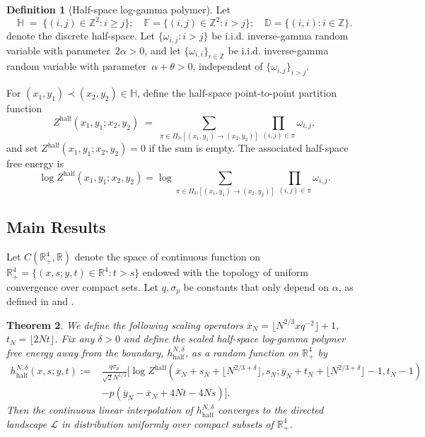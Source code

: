 \documentclass[11pt]{article}
\newtheorem{theorem}{Theorem}[section]
\theoremstyle{definition}
\newtheorem{definition}[theorem]{Definition}
\newcommand{\R}{\mathbb{R}}
\newcommand{\Z}{\mathbb{Z}}
\newcommand{\HH}{\mathbb{H}}
\newcommand{\F}{\mathbb{F}}
\newcommand{\D}{\mathbb{D}}
\begin{document}
\begin{definition}[Half-space log-gamma polymer]
Let
\[
\HH \;=\; \{(i,j)\in\Z^2 : i\ge j\} ; \quad  \F=\{(i,j)\in\Z^2 : i > j\}; \quad \D = \{(i,i): i \in \Z \}.
\]
denote the discrete half-space.  
Let $\{\omega_{i,j}: i>j\}$ be i.i.d. inverse-gamma random variable with parameter~$2\alpha >0$, and let $\{\omega_{i,i}\}_{i\in\Z}$ be  i.i.d. inverse-gamma random variable with parameter~$\alpha + \theta > 0$, independent of $\{\omega_{i,j}\}_{i>j}$.

For $(x_1,y_1)\prec(x_2,y_2) \in \HH$, define the half-space point-to-point partition function
\[
Z^{\mathrm{half}}(x_1,y_1;x_2,y_2)
\;=\;\sum_{\pi \in \Pi_{\HH}[(x_1,y_1)\to(x_2,y_2)]}
\prod_{(i,j)\in\pi} \omega_{i,j},
\]
and set $Z^{\mathrm{half}}(x_1,y_1;x_2,y_2)=0$ if the sum is empty. The associated half-space free energy is
\[
\log Z^{\mathrm{half}}(x_1,y_1;x_2,y_2) = \log \sum_{\pi \in \Pi_{\HH}[(x_1,y_1)\to(x_2,y_2)]}
\prod_{(i,j)\in\pi} \omega_{i,j}.
\]
\end{definition}

\subsection{Main Results}
Let $C(\R^4_+, \R)$ denote the space of continuous function on $\R^4_+ = \{(x,s;y,t) \in \R^4: t>s\}$ endowed with the topology of uniform convergence over compact sets. Let $q, \sigma_p$ be constants that only depend on $\alpha$, as defined in \cite[Definition 3.1]{zhang2025convergence} and \cite[Theorem 3.3]{zhang2025convergence}.

\begin{theorem}
\label{thm_half_loggamma_to_DL}
We define the following scaling operators $\overline{x}_N = \lfloor N^{2/3}xq^{-2} \rfloor + 1$, $t_N = \lfloor 2Nt \rfloor$. Fix any $\delta>0$ and define the scaled half-space log-gamma polymer free energy away from the boundary,
$h_{\mathrm{half}}^{N, \delta}$, as a random function on $\R_+^4$ by
 \begin{equation}
 \begin{aligned}
     h_{\mathrm{half}}^{N,\delta}(x,s;y,t) := &\frac{q\sigma_p}{\sqrt{2}N^{1/3}}\bigg[ \log Z^{\mathrm{half}}(\overline{x}_N + s_N+\lfloor N^{2/3+\delta}\rfloor, s_N;\overline{y}_N + t_N + \lfloor N^{2/3+\delta}\rfloor -1, t_N-1)\\
     &-p\left( \overline{y}_N - \overline{x}_N + 4Nt-4Ns\right)\bigg].
 \end{aligned}
    \end{equation}
Then the continuous linear interpolation of $h_{\mathrm{half}}^{N,\delta}$ converges to the directed landscape $\mathcal{L}$ in distribution uniformly over compact subsets of $\R_+^4$.
\end{theorem}
\end{document}
